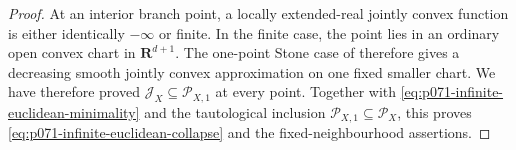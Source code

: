 \begin{proof}
At an interior branch point, a locally extended-real jointly convex
function is either identically $-\infty$ or finite.  In the finite case,
the point lies in an ordinary open convex chart in
$\mathbf R^{d+1}$.  The one-point Stone case of
 therefore gives a decreasing
smooth jointly convex approximation on one fixed smaller chart.  We have
therefore proved
$\mathcal J_X\subseteq\mathcal P_{X,1}$ at every point.  Together with
\eqref{eq:p071-infinite-euclidean-minimality} and the tautological inclusion
$\mathcal P_{X,1}\subseteq\mathcal P_X$, this proves
\eqref{eq:p071-infinite-euclidean-collapse} and the fixed-neighbourhood
assertions.
\end{proof}
